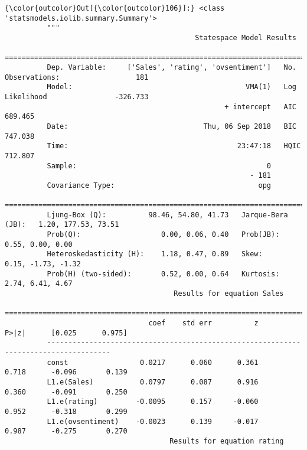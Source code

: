 \documentclass[11pt]{article}
\begin{document}
\begin{Verbatim}[commandchars=\\\{\}]
{\color{outcolor}Out[{\color{outcolor}106}]:} <class 'statsmodels.iolib.summary.Summary'>
          """
                                             Statespace Model Results                                   
          ==============================================================================================
          Dep. Variable:     ['Sales', 'rating', 'ovsentiment']   No. Observations:                  181
          Model:                                         VMA(1)   Log Likelihood                -326.733
                                                    + intercept   AIC                            689.465
          Date:                                Thu, 06 Sep 2018   BIC                            747.038
          Time:                                        23:47:18   HQIC                           712.807
          Sample:                                             0                                         
                                                          - 181                                         
          Covariance Type:                                  opg                                         
          =====================================================================================
          Ljung-Box (Q):          98.46, 54.80, 41.73   Jarque-Bera (JB):   1.20, 177.53, 73.51
          Prob(Q):                   0.00, 0.06, 0.40   Prob(JB):              0.55, 0.00, 0.00
          Heteroskedasticity (H):    1.18, 0.47, 0.89   Skew:                0.15, -1.73, -1.32
          Prob(H) (two-sided):       0.52, 0.00, 0.64   Kurtosis:              2.74, 6.41, 4.67
                                        Results for equation Sales                             
          =====================================================================================
                                  coef    std err          z      P>|z|      [0.025      0.975]
          -------------------------------------------------------------------------------------
          const                 0.0217      0.060      0.361      0.718      -0.096       0.139
          L1.e(Sales)           0.0797      0.087      0.916      0.360      -0.091       0.250
          L1.e(rating)         -0.0095      0.157     -0.060      0.952      -0.318       0.299
          L1.e(ovsentiment)    -0.0023      0.139     -0.017      0.987      -0.275       0.270
                                       Results for equation rating                             

\end{Verbatim}
\end{document}
